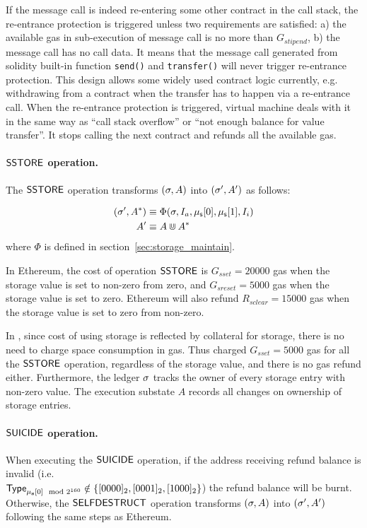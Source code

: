 If the message call is indeed re-entering some other contract in the call stack,
the re-entrance protection is triggered 
unless two requirements are satisfied: a) the available gas in sub-execution of message call is no more than $G_{stipend}$, 
b) the message call has no call data. 
It means that the message call generated from solidity built-in function {\tt send()} and {\tt transfer()} will never trigger
re-entrance protection. This design allows some widely used contract logic currently, 
e.g. withdrawing \cfx from a contract when the transfer has to happen via a re-entrance call. 
%
When the re-entrance protection is triggered, {\name} virtual machine deals with it in the same way as ``call stack overflow'' or ``not enough balance for value transfer''. It stops calling the next contract and refunds all the available gas.



\paragraph{$\mathsf{SSTORE}$ operation.} 
The $\mathsf{SSTORE}$ operation transforms $(\mathbf{\sigma},A)$ into $(\mathbf{\sigma}',A')$ as follows:

\begin{align}
	(\mathbf{\sigma}', A^*)   &\equiv \Phi(\mathbf{\sigma},I_a, \mathbf{\mu}_{\sf s}[0],\mathbf{\mu}_{\sf s}[1],I_i) \\ 
	A'     &\equiv A \Cup A^*
\end{align}
%
where $\Phi$ is defined in section~\ref{sec:storage_maintain}.

In Ethereum, the cost of operation $\mathsf{SSTORE}$ is $G_{sset}=20000$ gas when the storage value is set to non-zero from zero,
and  $G_{sreset}=5000$ gas when the storage value is set to zero. 
Ethereum will also refund $R_{sclear}=15000$ gas when the storage value is set to zero from non-zero. 

In {\name}, since cost of using storage is reflected by collateral for storage, there is no need to charge space consumption in gas. 
Thus {\name} charged $G_{sset}=5000$ gas for all the $\mathsf{SSTORE}$ operation, 
regardless of the storage value,
and there is no gas refund either. 
Furthermore, the {\name} ledger $\mathbf{\sigma}$ tracks the owner of every storage entry with non-zero value. 
The execution substate $A$ records all changes on ownership of storage entries. 

\paragraph{$\mathsf{SUICIDE}$ operation.} When executing the $\mathsf{SUICIDE}$ operation, if the address receiving refund balance is invalid (i.e. \\$\mathsf{Type}_{\mathbf{\mu}_{\mathbf{s}}[0]\mod2^{160}}\notin{\left \{{\ensuremath{[0000]_2},\ensuremath{[0001]_2},\ensuremath{[1000]_2}} \right \}}$) the refund balance will be burnt. Otherwise, the $\mathsf{SELFDESTRUCT}$ operation transforms $(\mathbf{\sigma},A)$ into $(\mathbf{\sigma}',A')$ following the same steps as Ethereum. 

